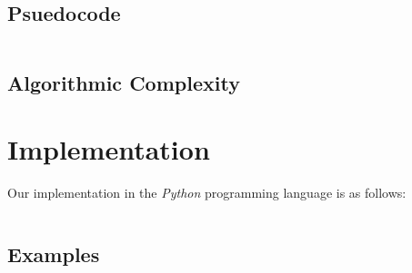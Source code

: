 \documentclass[titlepage,12pt]{article}
\begin{document}

\subsection{Psuedocode}

\inputminted{python3}{dp.py}

\subsection{Algorithmic Complexity}


\section{Implementation}

Our implementation in the \emph{Python} programming language is as follows:

\inputminted{python3}{dp.py}

\subsection{Examples}

\end{document}
